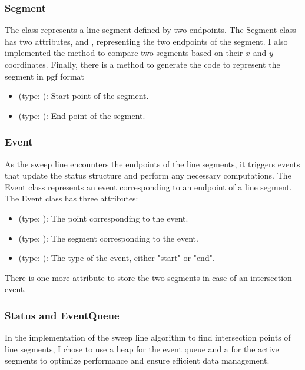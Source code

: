 \documentclass[10pt,a4paper,hidelinks]{article}
\begin{document}
\subsubsection{Segment}
The  class represents a line segment defined by two endpoints. The Segment class has two attributes,  and , representing the two endpoints of the segment. I also implemented the  method to compare two segments based on their $x$ and $y$ coordinates. Finally, there is a method to generate the code to represent the segment in pgf format
\begin{itemize}
    \item {} (type: ): Start point of the segment.
    \item {} (type: ): End point of the segment.
\end{itemize}


\subsubsection{Event}
As the sweep line encounters the endpoints of the line segments, it triggers events that update the status structure and perform any necessary computations. The Event class represents an event corresponding to an endpoint of a line segment. The Event class has three attributes:
\begin{itemize}
    \item {} (type: ): The point corresponding to the event.
    \item {} (type: ): The segment corresponding to the event.
    \item {} (type: ): The type of the event, either "start" or "end".
\end{itemize}
There is one more attribute to store the two segments in case of an intersection event.


\subsubsection{Status and EventQueue}
In the implementation of the sweep line algorithm to find intersection points of line segments, I chose to use a heap for the event queue and a  for the active segments to optimize performance and ensure efficient data management.\\
\end{document}
